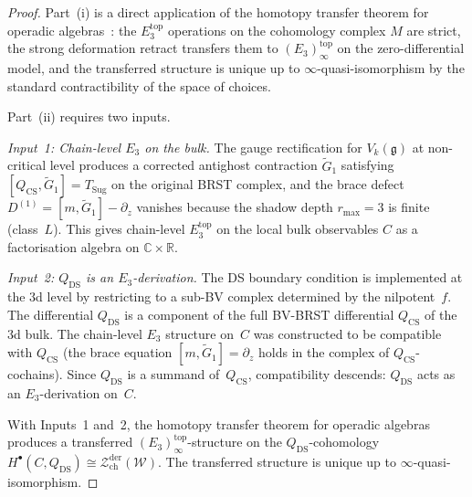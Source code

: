 \documentclass[11pt,reqno]{amsart}
\theoremstyle{definition}
\theoremstyle{remark}
\providecommand{\cW}{\mathcal{W}}
\providecommand{\cZ}{\mathcal{Z}}
\providecommand{\fg}{\mathfrak{g}}
\providecommand{\Ethree}{E_3}
\providecommand{\bC}{\mathbb{C}}
\providecommand{\bR}{\mathbb{R}}
\begin{document}
\begin{proof}
Part~(i) is a direct application of the homotopy transfer
theorem for operadic algebras~\cite{LV12}: the
$\Ethree^{\mathrm{top}}$ operations on the cohomology
complex $M$ are strict, the strong deformation retract
transfers them to $(\Ethree)_\infty^{\mathrm{top}}$ on the
zero-differential model, and the transferred structure is
unique up to $\infty$-quasi-isomorphism by the standard
contractibility of the space of choices.

Part~(ii) requires two inputs.

\emph{Input~1: Chain-level $\Ethree$ on the bulk.}
The gauge rectification for $V_k(\fg)$ at non-critical
level produces a corrected antighost contraction
$\widetilde{G}_1$ satisfying
$[Q_{\mathrm{CS}}, \widetilde{G}_1] = T_{\mathrm{Sug}}$
on the original BRST complex, and the brace defect
$D^{(1)} = [m, \widetilde{G}_1] - \partial_z$ vanishes
because the shadow depth $r_{\max} = 3$ is finite
(class~$L$). This gives chain-level $\Ethree^{\mathrm{top}}$
on the local bulk observables $C$ as a factorisation algebra
on $\bC \times \bR$.

\emph{Input~2: $Q_{\mathrm{DS}}$ is an $\Ethree$-derivation.}
The DS boundary condition is implemented at the $3$d level
by restricting to a sub-BV complex determined by the
nilpotent~$f$. The differential $Q_{\mathrm{DS}}$ is a
component of the full BV-BRST differential $Q_{\mathrm{CS}}$
of the $3$d bulk. The chain-level $\Ethree$ structure on~$C$
was constructed to be compatible with $Q_{\mathrm{CS}}$
(the brace equation $[m, \widetilde{G}_1] = \partial_z$
holds in the complex of $Q_{\mathrm{CS}}$-cochains).
Since $Q_{\mathrm{DS}}$ is a summand of~$Q_{\mathrm{CS}}$,
compatibility descends: $Q_{\mathrm{DS}}$ acts as an
$\Ethree$-derivation on~$C$.

With Inputs~1 and~2, the homotopy transfer theorem
for operadic algebras produces a transferred
$(\Ethree)_\infty^{\mathrm{top}}$-structure on the
$Q_{\mathrm{DS}}$-cohomology
$H^\bullet(C, Q_{\mathrm{DS}}) \cong
\cZ^{\mathrm{der}}_{\mathrm{ch}}(\cW)$.
The transferred structure is unique up to
$\infty$-quasi-isomorphism.
\end{proof}
\end{document}
